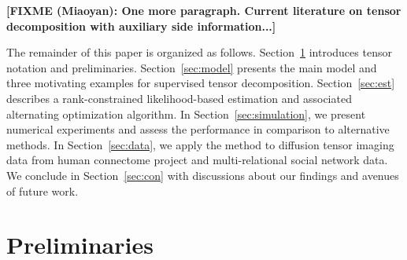 \documentclass[12pt]{article}
\theoremstyle{plain}
\theoremstyle{definition}
\def\fixme#1#2{\textbf{\color{red}[FIXME (#1): #2]}}
\begin{document}
\fixme{Miaoyan}{One more paragraph. Current literature on tensor decomposition with auxiliary side information...}

The remainder of this paper is organized as follows. Section~\ref{sec:pre} introduces tensor notation and preliminaries. Section~\ref{sec:model} presents the main model and three motivating examples for supervised tensor decomposition. Section~\ref{sec:est} describes a rank-constrained likelihood-based estimation and associated alternating optimization algorithm. In Section~\ref{sec:simulation}, we present numerical experiments and assess the performance in comparison to alternative methods. In Section~\ref{sec:data}, we apply the method to diffusion tensor imaging data from human connectome project and multi-relational social network data. We conclude in Section~\ref{sec:con} with discussions about our findings and avenues of future work.

\section{Preliminaries}\label{sec:pre}
\end{document}
